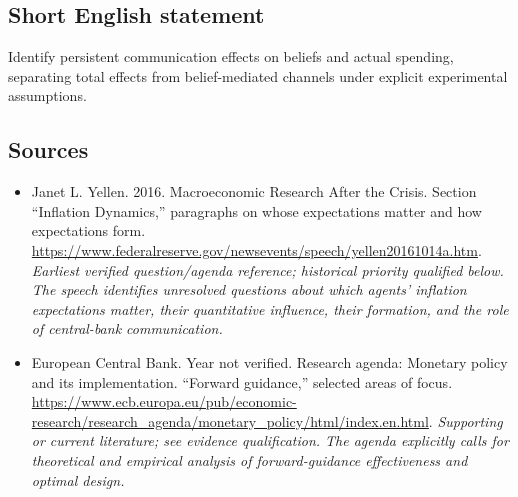 \documentclass[11pt]{article}
\begin{document}
\subsection{Short English statement}
Identify persistent communication effects on beliefs and actual spending, separating total effects from belief-mediated channels under explicit experimental assumptions.

\subsection{Sources}
\begin{itemize}\raggedright
\item[\textnormal{[S1]}]\hypertarget{source:30007531:1}{} Janet L. Yellen. 2016. Macroeconomic Research After the Crisis. Section “Inflation Dynamics,” paragraphs on whose expectations matter and how expectations form.
\url{https://www.federalreserve.gov/newsevents/speech/yellen20161014a.htm}.
{\small\textit{Earliest verified question/agenda reference; historical priority qualified below. The speech identifies unresolved questions about which agents’ inflation expectations matter, their quantitative influence, their formation, and the role of central-bank communication.}}

\item[\textnormal{[S2]}]\hypertarget{source:30007531:2}{} European Central Bank. Year not verified. Research agenda: Monetary policy and its implementation. “Forward guidance,” selected areas of focus.
\url{https://www.ecb.europa.eu/pub/economic-research/research_agenda/monetary_policy/html/index.en.html}.
{\small\textit{Supporting or current literature; see evidence qualification. The agenda explicitly calls for theoretical and empirical analysis of forward-guidance effectiveness and optimal design.}}
\end{itemize}
\end{document}
